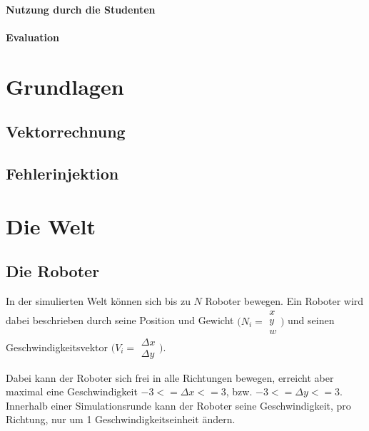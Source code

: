 \documentclass[
    12pt,
    bibliography=totoc,
    ngerman
]{scrartcl}
\begin{document}

\paragraph{Nutzung durch die Studenten} 

\paragraph{Evaluation}

\clearpage
\section{Grundlagen}

\subsection{Vektorrechnung}

\subsection{Fehlerinjektion}

\clearpage
\section{Die Welt}

\subsection{Die Roboter}
In der simulierten Welt k{\"{o}}nnen sich bis zu $N$ Roboter bewegen.
Ein Roboter wird dabei beschrieben durch seine Position und Gewicht
$ \bigl(N_i = \begin{smallmatrix} x \\ y \\ w \end{smallmatrix} \bigr)$ und
seinen Geschwindigkeitsvektor
$ \bigl(V_i = \begin{smallmatrix} \Delta x \\ \Delta y \end{smallmatrix} \bigr)$.

Dabei kann der Roboter sich frei in alle Richtungen bewegen, erreicht aber
maximal eine Geschwindigkeit $ -3 <= \Delta x <= 3$, bzw. 
$ -3 <= \Delta y <= 3$.
Innerhalb einer Simulationsrunde kann der Roboter seine Geschwindigkeit, pro
Richtung, nur um 1 Geschwindigkeitseinheit {\"{a}}ndern.
\end{document}
